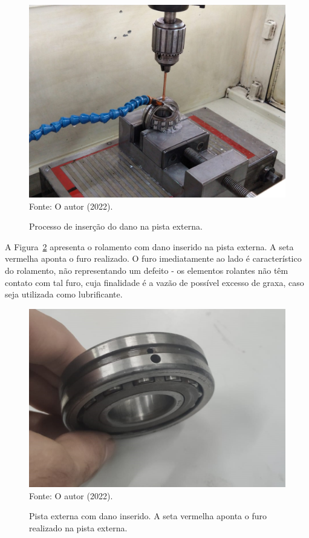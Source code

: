 \documentclass[
	12pt,				
	oneside,			
	a4paper,			
	english,			
	brazil,	
	sumario=abnt-6027-2012		
	]{abntex2ppgsi}
\begin{document}
\begin{figure}[H]
\centering
\caption {Processo de inserção do dano na pista externa.}
\includegraphics[width=\textwidth,keepaspectratio]{insercao_dano_pista_externa} \\
Fonte: O autor (2022).
\label{insercao_dano_pista_externa}
\end{figure}

A Figura~\ref{dano_pista_externa} apresenta o rolamento com dano inserido na pista externa. A seta vermelha aponta o furo realizado. O furo imediatamente ao lado é característico do rolamento, não representando um defeito - os elementos rolantes não têm contato com tal furo, cuja finalidade é a vazão de possível excesso de graxa, caso seja utilizada como lubrificante.

\begin{figure}[H]
\centering
\caption {Pista externa com dano inserido. A seta vermelha aponta o furo realizado na pista externa.}
\includegraphics[width=\textwidth,keepaspectratio]{dano_pista_externa_certo} \\
Fonte: O autor (2022).
\label{dano_pista_externa}
\end{figure}
\end{document}
